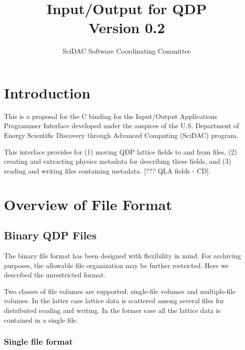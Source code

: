 \documentclass{article}
\begin{document}
\title{
   Input/Output for QDP \\{\large Version 0.2}
}
\author{ SciDAC Software Coordinating Committee}

\maketitle
\section{Introduction}
This is a proposal for the C binding for the Input/Output
Applications Programmer Interface developed under the auspices of the
U.S. Department of Energy Scientific Discovery through Advanced
Computing (SciDAC) program.

This interface provides for (1) moving QDP lattice fields to and from
files, (2) creating and extracting physics metadata for describing
these fields, and (3) reading and writing files containing metadata.
[??? QLA fields - CD].

\section{Overview of File Format}
\label{sec.fileformat}

\subsection{Binary QDP Files}

The binary file format has been designed with flexibility in mind. For
archiving purposes, the allowable file organization may be further
restricted.  Here we described the unrestricted format.

Two classes of file volumes are supported: single-file volumes and
multiple-file volumes.  In the latter case lattice data is scattered
among several files for distributed reading and writing.  In the
former case all the lattice data is contained in a single file.

\subsubsection{Single file format}
\end{document}
